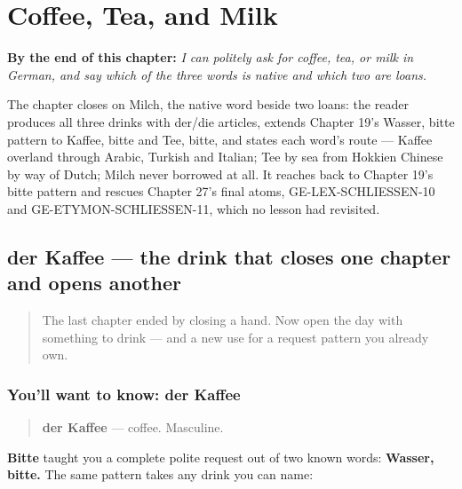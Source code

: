 
\chapter{Coffee, Tea, and Milk}
\label{ch:ge-coffee-tea-milk}

\begin{chapteropening}
\textbf{By the end of this chapter:} \emph{I can politely ask for coffee, tea, or milk in German, and say which of the three words is native and which two are loans.}

The chapter closes on Milch, the native word beside two loans: the reader produces all three drinks with der/die articles, extends Chapter 19's Wasser, bitte pattern to Kaffee, bitte and Tee, bitte, and states each word's route — Kaffee overland through Arabic, Turkish and Italian; Tee by sea from Hokkien Chinese by way of Dutch; Milch never borrowed at all. It reaches back to Chapter 19's bitte pattern and rescues Chapter 27's final atoms, GE-LEX-SCHLIESSEN-10 and GE-ETYMON-SCHLIESSEN-11, which no lesson had revisited.
\end{chapteropening}

\section[der Kaffee]{der Kaffee — the drink that closes one chapter and opens another}

\label{lesson:GE-C28-kaffee}



\begin{quote}
The last chapter ended by closing a hand. Now open the day with something to drink — and a new use for a request pattern you already own.
\end{quote}

\subsection*{You'll want to know: der Kaffee}
\begin{quote}
\textbf{der Kaffee} — coffee. Masculine.
\end{quote}

\textbf{Bitte} taught you a complete polite request out of two known words: \textbf{Wasser, bitte.} The same pattern takes any drink you can name:

